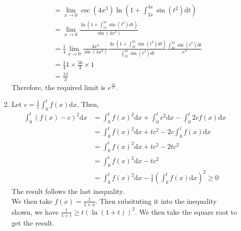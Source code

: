 \documentclass[12pt]{article}
\newcommand{\diff}{\mathrm{d}}
\theoremstyle{definition}
\begin{document}
\begin{enumerate}
\begin{enumerate}
\begin{align*}
    &= \lim_{x\to 0}\csc(4x^3)\ln(1+\int_{2x}^{4x}\sin(t^2)\diff t)\\
    &=\lim_{x\to 0}\frac{\ln(1+\int_{2x}^{4x}\sin(t^2)\diff t)}{\sin (4x^3)}\\
    &=\frac{1}{4} \lim_{x\to 0} \frac{4x^{3}}{\sin(4x^{3})}\frac{\ln \left(1+\int_{2x}^{4x} \sin(t^{2})dt\right)}{\int_{2x}^{4x}\sin(t^{2})dt}\frac{\int_{2x}^{4x}\sin(t^{2})dt}{x^{3}}\\
    &=\frac{1}{4}1\times\frac{56}{3}\times 1\\
    &=\frac{14}{3}
    \end{align*}
    Therefore, the required limit is $e^\frac{14}{3}$.
    \item Let $c=\frac{1}{t}\int_0^t f(x)\diff x$. Then,
    \begin{align*}
    \int_0^t \left(f(x) -c\right)^2 \diff x &= \int_0^t f(x)^2\diff x + \int_0^t c^2\diff x -\int_0^t 2cf(x)\diff x \\
    &= \int_0^t f(x)^2\diff x + tc^2 - 2c\int_0^t f(x)\diff x\\
    &= \int_0^t f(x)^2\diff x + tc^2 -2tc^2  \\ 
    &= \int_0^t f(x)^2\diff x - tc^2\\
    &= \int_0^t f(x)^2\diff x -\frac{1}{t}(\int_0^tf(x)\diff x)^2\geq 0
    \end{align*}
    The result follows the last inequality.\\
    We then take $f(x)=\frac{1}{1+x}$. Then subsituting it into the inequality shown, we have $\frac{t}{1+t}\geq t(\ln(1+t))^2$. We then take the square root to get the result.
  \end{enumerate}
\end{enumerate}
\end{document}
